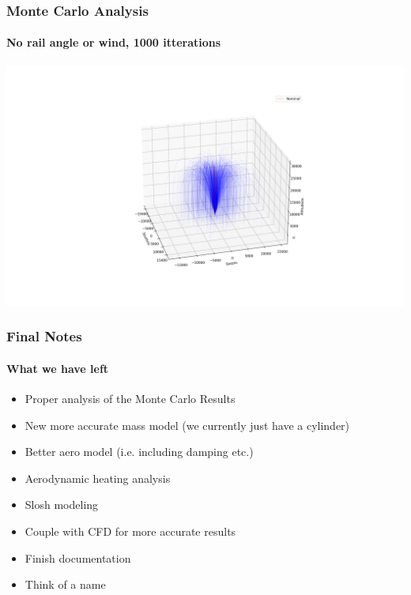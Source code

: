 \documentclass{beamer}
\begin{document}
    \begin{frame}
        \frametitle{Monte Carlo Analysis}
        \framesubtitle{No rail angle or wind, 1000 itterations}
        \begin{center}
            \includegraphics[width=\textwidth]{images/stats_example2_with_nom.png}
        \end{center}
    \end{frame}

    \begin{frame}
        \frametitle{Final Notes}
        \framesubtitle{What we have left}
        \begin{itemize}
            \item Proper analysis of the Monte Carlo Results
            \item New more accurate mass model (we currently just have a cylinder)
            \item Better aero model (i.e. including damping etc.)
            \item Aerodynamic heating analysis
            \item Slosh modeling
            \item Couple with CFD for more accurate results 
            \item Finish documentation
            \item Think of a name
        \end{itemize} 
    \end{frame}
\end{document}
